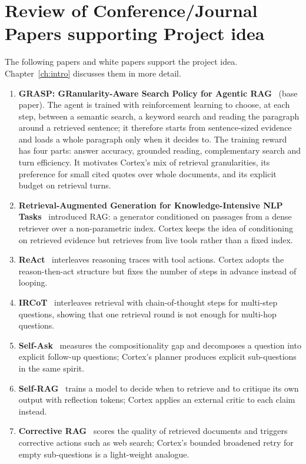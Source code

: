\documentclass[oneside,a4paper,12pt]{report}
\begin{document}
\section{Review of Conference/Journal Papers supporting Project idea}
\label{sec:survey}
The following papers and white papers support the project idea. Chapter~\ref{ch:intro} discusses them in more detail.
\begin{enumerate}
\item \textbf{GRASP: GRanularity-Aware Search Policy for Agentic RAG}~\cite{grasp2026} (base paper). The agent is trained with reinforcement learning to choose, at each step, between a semantic search, a keyword search and reading the paragraph around a retrieved sentence; it therefore starts from sentence-sized evidence and loads a whole paragraph only when it decides to. The training reward has four parts: answer accuracy, grounded reading, complementary search and turn efficiency. It motivates Cortex's mix of retrieval granularities, its preference for small cited quotes over whole documents, and its explicit budget on retrieval turns.
\item \textbf{Retrieval-Augmented Generation for Knowledge-Intensive NLP Tasks}~\cite{lewis2020rag} introduced RAG: a generator conditioned on passages from a dense retriever over a non-parametric index. Cortex keeps the idea of conditioning on retrieved evidence but retrieves from live tools rather than a fixed index.
\item \textbf{ReAct}~\cite{yao2023react} interleaves reasoning traces with tool actions. Cortex adopts the reason-then-act structure but fixes the number of steps in advance instead of looping.
\item \textbf{IRCoT}~\cite{trivedi2023ircot} interleaves retrieval with chain-of-thought steps for multi-step questions, showing that one retrieval round is not enough for multi-hop questions.
\item \textbf{Self-Ask}~\cite{press2023selfask} measures the compositionality gap and decomposes a question into explicit follow-up questions; Cortex's planner produces explicit sub-questions in the same spirit.
\item \textbf{Self-RAG}~\cite{asai2024selfrag} trains a model to decide when to retrieve and to critique its own output with reflection tokens; Cortex applies an external critic to each claim instead.
\item \textbf{Corrective RAG}~\cite{yan2024crag} scores the quality of retrieved documents and triggers corrective actions such as web search; Cortex's bounded broadened retry for empty sub-questions is a light-weight analogue.

\end{enumerate}
\end{document}
